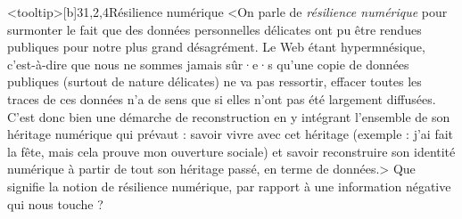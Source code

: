 \begin{quiz}[title={Réseaux sociaux}]
\begin{quizquestion*}<tooltip>[b]{3}{1,2,4}{Résilience numérique}
<On parle de \emph{résilience numérique} pour surmonter le fait que des données personnelles délicates ont pu être rendues publiques pour notre plus grand désagrément.
Le Web étant hypermnésique, c'est-à-dire que nous ne sommes jamais sûr·e·s qu'une copie de données publiques (surtout de nature délicates) ne va pas ressortir, effacer toutes les traces de ces données n'a de sens que si elles n'ont pas été largement diffusées.
C'est donc bien une démarche de reconstruction en y intégrant l'ensemble de son héritage numérique qui prévaut : savoir vivre avec cet héritage (exemple : j’ai fait la fête, mais cela prouve mon ouverture sociale) et savoir reconstruire son identité numérique à partir de tout son héritage passé, en terme de données.>
Que signifie la notion de résilience numérique, par rapport à une information négative qui nous touche ? 
\end{quizquestion*}


\end{quiz}
